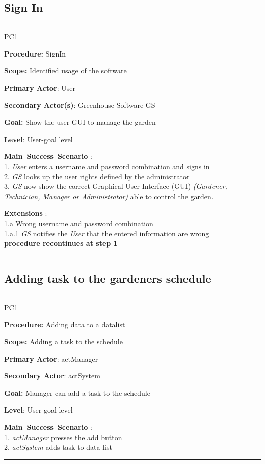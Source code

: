 \subsection{Sign In}
\vspace{0.5cm}
\hrule
\hfill \break
\begin{lyxlist}{PC1}
\small{
\item [\textbf{Procedure:}] SignIn
\item [\textbf{Scope:}] Identified usage of the software
\item [\textbf{Primary Actor}:] User
\item [\textbf{Secondary Actor(s)}:] Greenhouse Software GS
\item [\textbf{Goal:}] Show the user GUI to manage the garden
\item [\textbf{Level}:] User-goal level
\item [\textbf{Main~Success~Scenario}]:\\
1. \emph{User} enters a username and password combination and signs in\\
2. \emph{GS} looks up the user rights defined by the administrator\\
3. \emph{GS} now show the correct Graphical User Interface (GUI) \emph{(Gardener, Technician, Manager or Administrator)} able to control the garden.
\item [\textbf{Extensions}]:\\
1.a Wrong username and password combination\\
\hspace*{0.5cm} 1.a.1 \emph{GS} notifies the \emph{User} that the entered information are wrong\\
\hspace*{0.5cm} \textbf{procedure recontinues at step 1}
}
\end{lyxlist}
\hrule
\vspace{0.5cm}


\subsection{Adding task to the gardeners schedule}
\vspace{0.5cm}
\hfill \break
\hrule
\begin{lyxlist}{PC1}
\small{
\item [\textbf{Procedure:}] Adding data to a datalist
\item [\textbf{Scope:}] Adding a task to the schedule
\item [\textbf{Primary Actor}:] actManager
\item [\textbf{Secondary Actor}:] actSystem
\item [\textbf{Goal:}] Manager can add a task to the schedule
\item [\textbf{Level}:] User-goal level
\item [\textbf{Main~Success~Scenario}]:\\
1. \emph{actManager} presses the add button\\
2. \emph{actSystem} adds task to data list\\
}
\end{lyxlist}
\hrule
\vspace{0.5cm}

